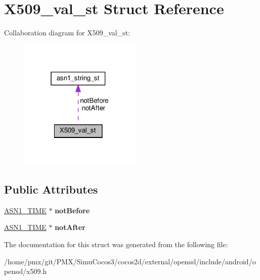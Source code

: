 \hypertarget{structX509__val__st}{}\section{X509\+\_\+val\+\_\+st Struct Reference}
\label{structX509__val__st}


Collaboration diagram for X509\+\_\+val\+\_\+st\+:
\nopagebreak
\begin{figure}[H]
\begin{center}
\leavevmode
\includegraphics[width=166pt]{structX509__val__st__coll__graph}
\end{center}
\end{figure}
\subsection*{Public Attributes}
\begin{DoxyCompactItemize}
\item 
\mbox{\label{structX509__val__st_a2be76c94cbb06e392fdfd793b57907e0}} 
\hyperlink{structasn1__string__st}{A\+S\+N1\+\_\+\+T\+I\+ME} $\ast$ {\bfseries not\+Before}
\item 
\mbox{\label{structX509__val__st_a39c616d92635a720e0ceeb7b5de5ebc0}} 
\hyperlink{structasn1__string__st}{A\+S\+N1\+\_\+\+T\+I\+ME} $\ast$ {\bfseries not\+After}
\end{DoxyCompactItemize}


The documentation for this struct was generated from the following file\+:\begin{DoxyCompactItemize}
\item 
/home/pmx/git/\+P\+M\+X/\+Simu\+Cocos3/cocos2d/external/openssl/include/android/openssl/x509.\+h\end{DoxyCompactItemize}
